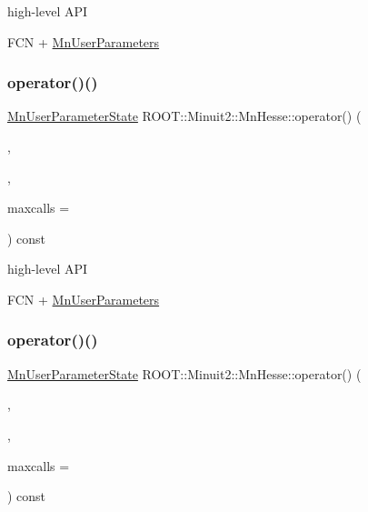 high-\/level A\+PI

F\+CN + \mbox{\hyperlink{classROOT_1_1Minuit2_1_1MnUserParameters}{Mn\+User\+Parameters}} \mbox{\label{classROOT_1_1Minuit2_1_1MnHesse_ab7a2674f254e7f6056885d7d792ea671}} 
\subsubsection{\texorpdfstring{operator()()}{operator()()}\hspace{0.1cm}{\footnotesize\ttfamily [11/24]}}
{\footnotesize\ttfamily \mbox{\hyperlink{classROOT_1_1Minuit2_1_1MnUserParameterState}{Mn\+User\+Parameter\+State}} R\+O\+O\+T\+::\+Minuit2\+::\+Mn\+Hesse\+::operator() (\begin{DoxyParamCaption}\item[{const \mbox{\hyperlink{classROOT_1_1Minuit2_1_1FCNBase}{F\+C\+N\+Base}} \&}]{,  }\item[{const \mbox{\hyperlink{classROOT_1_1Minuit2_1_1MnUserParameters}{Mn\+User\+Parameters}} \&}]{,  }\item[{unsigned int}]{maxcalls = {} }\end{DoxyParamCaption}) const}

high-\/level A\+PI

F\+CN + \mbox{\hyperlink{classROOT_1_1Minuit2_1_1MnUserParameters}{Mn\+User\+Parameters}} \mbox{\label{classROOT_1_1Minuit2_1_1MnHesse_ab7a2674f254e7f6056885d7d792ea671}} 
\subsubsection{\texorpdfstring{operator()()}{operator()()}\hspace{0.1cm}{\footnotesize\ttfamily [12/24]}}
{\footnotesize\ttfamily \mbox{\hyperlink{classROOT_1_1Minuit2_1_1MnUserParameterState}{Mn\+User\+Parameter\+State}} R\+O\+O\+T\+::\+Minuit2\+::\+Mn\+Hesse\+::operator() (\begin{DoxyParamCaption}\item[{const \mbox{\hyperlink{classROOT_1_1Minuit2_1_1FCNBase}{F\+C\+N\+Base}} \&}]{,  }\item[{const \mbox{\hyperlink{classROOT_1_1Minuit2_1_1MnUserParameters}{Mn\+User\+Parameters}} \&}]{,  }\item[{unsigned int}]{maxcalls = {} }\end{DoxyParamCaption}) const}

